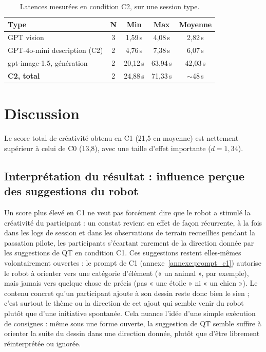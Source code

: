 \documentclass[11pt]{article}
\begin{document}
\begin{table}[H]
    \centering
    \begin{tabular}{@{}lcccc@{}}
        \toprule
        \textbf{Type} & \textbf{N} & \textbf{Min} & \textbf{Max} & \textbf{Moyenne} \\
        \midrule
        GPT vision                    & 3 & 1,59\,s  & 4,08\,s  & 2,82\,s \\
        GPT-4o-mini description (C2)  & 2 & 4,76\,s  & 7,38\,s  & 6,07\,s \\
        gpt-image-1.5, génération     & 2 & 20,12\,s & 63,94\,s & 42,03\,s \\
        \midrule
        \textbf{C2, total} & 2 & 24,88\,s & 71,33\,s & $\sim$48\,s \\
        \bottomrule
    \end{tabular}
    \caption{Latences mesurées en condition C2, sur une session type.}
    \label{tab:latence_c2}
\end{table}

\newpage

\section{Discussion}

Le score total de créativité obtenu en C1 (21,5 en moyenne) est nettement supérieur à celui de C0 (13,8), avec une taille d'effet importante ($d = 1{,}34$).

\subsection{Interprétation du résultat : influence perçue des suggestions du robot}
\label{sec:influence_suggestions}

Un score plus élevé en C1 ne veut pas forcément dire que le robot a stimulé la créativité du participant : un constat revient en effet de façon récurrente, à la fois dans les logs de session et dans les observations de terrain recueillies pendant la passation pilote, les participants s'écartant rarement de la direction donnée par les suggestions de QT en condition C1.
Ces suggestions restent elles-mêmes volontairement ouvertes : le prompt de C1 (annexe~\ref{annexe:prompt_c1}) autorise le robot à orienter vers une catégorie d'élément (« un animal », par exemple), mais jamais vers quelque chose de précis (pas « une étoile » ni « un chien »).
Le contenu concret qu'un participant ajoute à son dessin reste donc bien le sien ; c'est surtout le thème ou la direction de cet ajout qui semble venir du robot plutôt que d'une initiative spontanée.
Cela nuance l'idée d'une simple exécution de consignes : même sous une forme ouverte, la suggestion de QT semble suffire à orienter la suite du dessin dans une direction donnée, plutôt que d'être librement réinterprétée ou ignorée.
\end{document}

